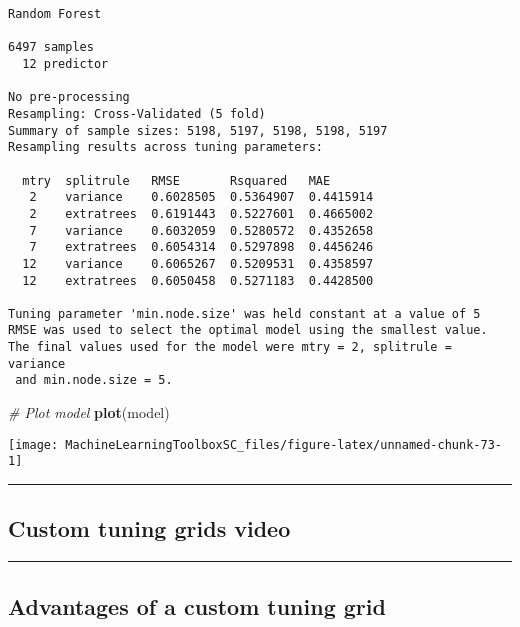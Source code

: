 \documentclass[]{book}
\newenvironment{Shaded}{\begin{snugshade}}{\end{snugshade}}
\newcommand{\KeywordTok}[1]{\textcolor[rgb]{0.13,0.29,0.53}{\textbf{#1}}}
\newcommand{\CommentTok}[1]{\textcolor[rgb]{0.56,0.35,0.01}{\textit{#1}}}
\newcommand{\NormalTok}[1]{#1}
\begin{document}
\begin{verbatim}
Random Forest 

6497 samples
  12 predictor

No pre-processing
Resampling: Cross-Validated (5 fold) 
Summary of sample sizes: 5198, 5197, 5198, 5198, 5197 
Resampling results across tuning parameters:

  mtry  splitrule   RMSE       Rsquared   MAE      
   2    variance    0.6028505  0.5364907  0.4415914
   2    extratrees  0.6191443  0.5227601  0.4665002
   7    variance    0.6032059  0.5280572  0.4352658
   7    extratrees  0.6054314  0.5297898  0.4456246
  12    variance    0.6065267  0.5209531  0.4358597
  12    extratrees  0.6050458  0.5271183  0.4428500

Tuning parameter 'min.node.size' was held constant at a value of 5
RMSE was used to select the optimal model using the smallest value.
The final values used for the model were mtry = 2, splitrule = variance
 and min.node.size = 5.
\end{verbatim}

\begin{Shaded}
\begin{Highlighting}[]
\CommentTok{# Plot model}
\KeywordTok{plot}\NormalTok{(model)}
\end{Highlighting}
\end{Shaded}

\begin{center}\texttt{[image: MachineLearningToolboxSC\_files/figure-latex/unnamed-chunk-73-1]} \end{center}

\begin{center}\rule{0.5\linewidth}{\linethickness}\end{center}

\subsection*{Custom tuning grids video}\label{custom-tuning-grids-video}

\begin{center}\rule{0.5\linewidth}{\linethickness}\end{center}

\subsection*{Advantages of a custom tuning
grid}\label{advantages-of-a-custom-tuning-grid}
\end{document}
